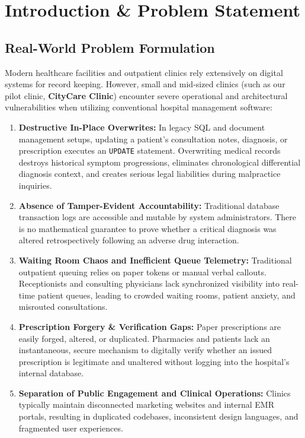\documentclass[12pt,a4paper,oneside]{report}
\begin{document}
\chapter{Introduction \& Problem Statement}

\section{Real-World Problem Formulation}
Modern healthcare facilities and outpatient clinics rely extensively on digital systems for record keeping. However, small and mid-sized clinics (such as our pilot clinic, \textbf{CityCare Clinic}) encounter severe operational and architectural vulnerabilities when utilizing conventional hospital management software:

\begin{enumerate}
    \item \textbf{Destructive In-Place Overwrites:} In legacy SQL and document management setups, updating a patient's consultation notes, diagnosis, or prescription executes an \texttt{UPDATE} statement. Overwriting medical records destroys historical symptom progressions, eliminates chronological differential diagnosis context, and creates serious legal liabilities during malpractice inquiries.
    \item \textbf{Absence of Tamper-Evident Accountability:} Traditional database transaction logs are accessible and mutable by system administrators. There is no mathematical guarantee to prove whether a critical diagnosis was altered retrospectively following an adverse drug interaction.
    \item \textbf{Waiting Room Chaos and Inefficient Queue Telemetry:} Traditional outpatient queuing relies on paper tokens or manual verbal callouts. Receptionists and consulting physicians lack synchronized visibility into real-time patient queues, leading to crowded waiting rooms, patient anxiety, and misrouted consultations.
    \item \textbf{Prescription Forgery \& Verification Gaps:} Paper prescriptions are easily forged, altered, or duplicated. Pharmacies and patients lack an instantaneous, secure mechanism to digitally verify whether an issued prescription is legitimate and unaltered without logging into the hospital's internal database.
    \item \textbf{Separation of Public Engagement and Clinical Operations:} Clinics typically maintain disconnected marketing websites and internal EMR portals, resulting in duplicated codebases, inconsistent design languages, and fragmented user experiences.
\end{enumerate}
\end{document}
